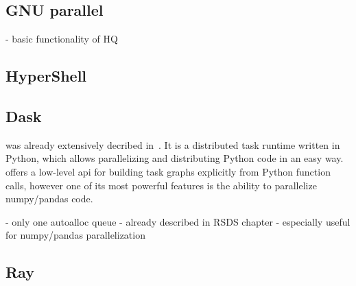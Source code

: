 \subsection*{GNU parallel}

- basic functionality of HQ


\subsection*{HyperShell}

\subsection*{Dask}

\dask{} was already extensively decribed in~. It is a distributed task
runtime written in Python, which allows parallelizing and distributing Python code in an easy
way. \dask{} offers a low-level \gls{api} for building task graphs explicitly from Python
function calls, however one of its most powerful features is the ability to parallelize
numpy/pandas code.

- only one autoalloc queue
- already described in RSDS chapter
- especially useful for numpy/pandas parallelization

\subsection*{Ray}

